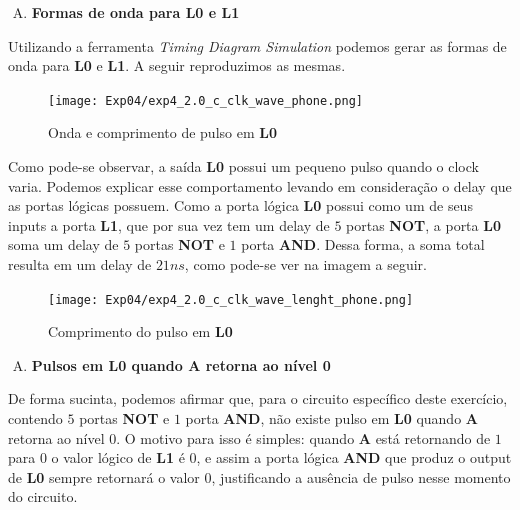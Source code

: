\documentclass[12pt]{article}
\begin{document}
\begin{enumerate}[C)]
\item \textbf{Formas de onda para L0 e L1}
\end{enumerate}

Utilizando a ferramenta \emph{Timing Diagram Simulation} podemos gerar as
formas de onda para \textbf{L0} e \textbf{L1}. A seguir reproduzimos as mesmas.

\begin{figure}[H]
    \centering
    \texttt{[image: Exp04/exp4\_2.0\_c\_clk\_wave\_phone.png]}
    \caption{Onda e comprimento de pulso em \textbf{L0}}\label{fig:exp4_2.0_c_clk_wave_phone.png}
\end{figure}

Como pode-se observar, a saída \textbf{L0} possui um pequeno pulso quando o
clock varia. Podemos explicar esse comportamento levando em consideração o delay
que as portas lógicas possuem. Como a porta lógica \textbf{L0} possui como um de
seus inputs a porta \textbf{L1}, que por sua vez tem um delay de $5$ portas
\textbf{NOT}, a porta \textbf{L0} soma um delay de $5$ portas \textbf{NOT} e $1$
porta \textbf{AND}. Dessa forma, a soma total resulta em um delay de $21ns$,
como pode-se ver na imagem a seguir.

\begin{figure}[H]
    \centering
    \texttt{[image: Exp04/exp4\_2.0\_c\_clk\_wave\_lenght\_phone.png]}
    \caption{Comprimento do pulso em \textbf{L0}}\label{fig:exp4_2.0_c_clk_wave_lenght_phone.png}
\end{figure}

\begin{enumerate}[D)]
\item \textbf{Pulsos em L0 quando A retorna ao nível 0}
\end{enumerate}

De forma sucinta, podemos afirmar que, para o circuito específico deste
exercício, contendo $5$ portas \textbf{NOT} e $1$ porta \textbf{AND}, não existe
pulso em \textbf{L0} quando \textbf{A} retorna ao nível $0$. O motivo para isso
é simples: quando \textbf{A} está retornando de $1$ para $0$ o valor lógico de
\textbf{L1} é $0$, e assim a porta lógica \textbf{AND} que produz o output de
\textbf{L0} sempre retornará o valor $0$, justificando a ausência de pulso nesse
momento do circuito.
\end{document}
